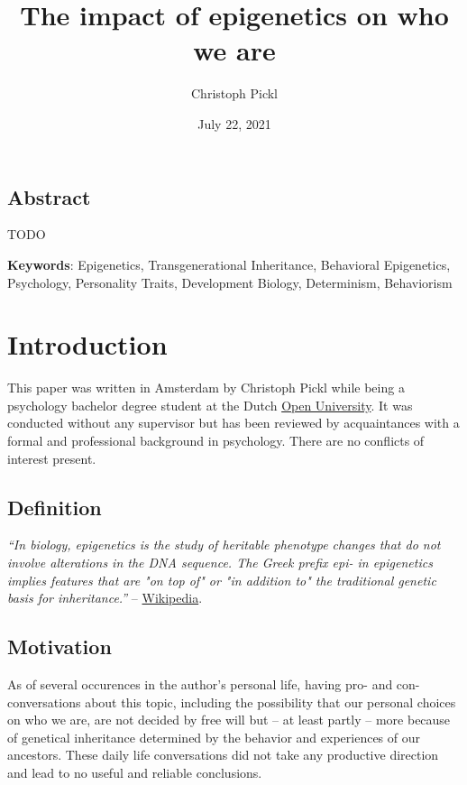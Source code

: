 \documentclass[11pt,twocolumn]{article}
\title{The impact of epigenetics on who we are}
\author{Christoph Pickl}
\date{July 22, 2021}
\begin{document}
\maketitle

\subsection*{Abstract}

TODO

\textbf{Keywords}: Epigenetics, Transgenerational Inheritance, Behavioral Epigenetics, Psychology, Personality Traits, Development Biology, Determinism, Behaviorism

\section{Introduction}

This paper was written in Amsterdam by Christoph Pickl while being a psychology bachelor degree student at the Dutch \href{https://www.ou.nl/en/}{Open University}. It was conducted without any supervisor but has been reviewed by acquaintances with a formal and professional background in psychology. There are no conflicts of interest present.

\subsection{Definition}

\textit{``In biology, epigenetics is the study of heritable phenotype changes that do not involve alterations in the DNA sequence. The Greek prefix epi- in epigenetics implies features that are "on top of" or "in addition to" the traditional genetic basis for inheritance.''} -- \href{https://en.wikipedia.org/wiki/Epigenetics}{Wikipedia}.

\subsection{Motivation}

As of several occurences in the author's personal life, having pro- and con-conversations about this topic, including the possibility that our personal choices on who we are, are not decided by free will but -- at least partly -- more because of genetical inheritance determined by the behavior and experiences of our ancestors. These daily life conversations did not take any productive direction and lead to no useful and reliable conclusions.
\end{document}
